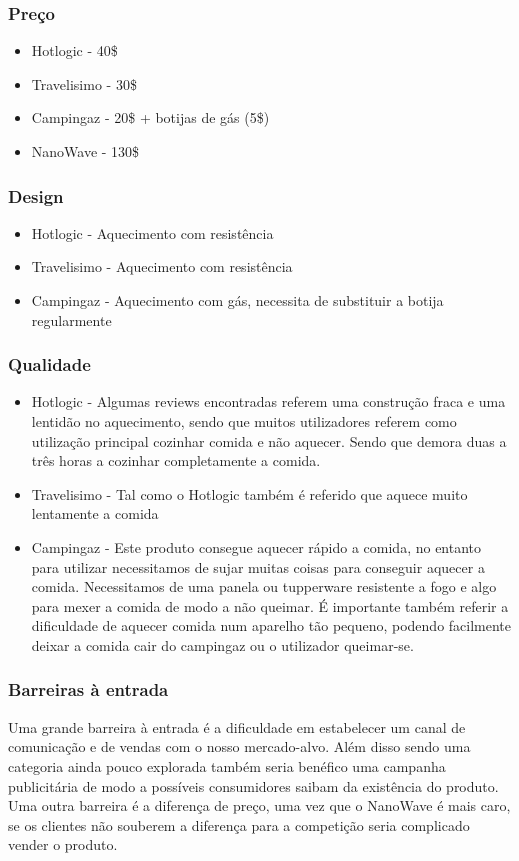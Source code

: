 \documentclass[a4paper]{article}
\begin{document}
\subsubsection{Preço}
\begin{itemize}
    \item Hotlogic - 40\$
    \item Travelisimo - 30\$
    \item Campingaz - 20\$ + botijas de gás (5\$)
    \item NanoWave -  130\$
\end{itemize}

\subsubsection{Design}
\begin{itemize}
    \item Hotlogic - Aquecimento com resistência 
    \item Travelisimo - Aquecimento com resistência
    \item Campingaz - Aquecimento com gás, necessita de substituir a botija regularmente
\end{itemize}

\subsubsection{Qualidade}
\begin{itemize}
    \item Hotlogic - Algumas reviews encontradas referem uma construção fraca e uma lentidão no aquecimento, sendo que muitos utilizadores referem como utilização principal cozinhar comida e não aquecer. Sendo que demora duas a três horas a cozinhar completamente a comida.
    \item Travelisimo - Tal como o Hotlogic também é referido que aquece muito lentamente a comida
    \item Campingaz - Este produto consegue aquecer rápido a comida, no entanto para utilizar necessitamos de sujar muitas coisas para conseguir aquecer a comida. Necessitamos de uma panela ou tupperware resistente a fogo e algo para mexer a comida de modo a não queimar. É importante também referir a dificuldade de aquecer comida num aparelho tão pequeno, podendo facilmente deixar a comida cair do campingaz ou o utilizador queimar-se.
\end{itemize}
\subsubsection{Barreiras à entrada}
Uma grande barreira à entrada é a dificuldade em estabelecer um canal de comunicação e de vendas com o nosso mercado-alvo. Além disso sendo uma categoria ainda pouco explorada também seria benéfico uma campanha publicitária de modo a possíveis consumidores saibam da existência do produto.\\
Uma outra barreira é a diferença de preço, uma vez que o NanoWave é mais caro, se os clientes não souberem a diferença para a competição seria complicado vender o produto.
\end{document}
